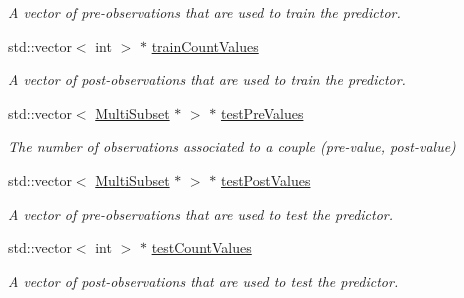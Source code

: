 \begin{DoxyCompactItemize}
\begin{DoxyCompactList}\small\item\em A vector of pre-\/observations that are used to train the predictor. \end{DoxyCompactList}\item 
\hypertarget{classPredictionDataset_af4fdcf7cfd236a99a73f18d630199291}{std\-::vector$<$ int $>$ $\ast$ \hyperlink{classPredictionDataset_af4fdcf7cfd236a99a73f18d630199291}{train\-Count\-Values}}\label{classPredictionDataset_af4fdcf7cfd236a99a73f18d630199291}

\begin{DoxyCompactList}\small\item\em A vector of post-\/observations that are used to train the predictor. \end{DoxyCompactList}\item 
\hypertarget{classPredictionDataset_a6ef1712f6f3e944cad7f966b123c44d4}{std\-::vector$<$ \hyperlink{classMultiSubset}{Multi\-Subset} $\ast$ $>$ $\ast$ \hyperlink{classPredictionDataset_a6ef1712f6f3e944cad7f966b123c44d4}{test\-Pre\-Values}}\label{classPredictionDataset_a6ef1712f6f3e944cad7f966b123c44d4}

\begin{DoxyCompactList}\small\item\em The number of observations associated to a couple (pre-\/value, post-\/value) \end{DoxyCompactList}\item 
\hypertarget{classPredictionDataset_ab6ed50cd17878109b9a41ebb6db172ea}{std\-::vector$<$ \hyperlink{classMultiSubset}{Multi\-Subset} $\ast$ $>$ $\ast$ \hyperlink{classPredictionDataset_ab6ed50cd17878109b9a41ebb6db172ea}{test\-Post\-Values}}\label{classPredictionDataset_ab6ed50cd17878109b9a41ebb6db172ea}

\begin{DoxyCompactList}\small\item\em A vector of pre-\/observations that are used to test the predictor. \end{DoxyCompactList}\item 
\hypertarget{classPredictionDataset_a7fe2eccbdae1cee136f5864b660c31ee}{std\-::vector$<$ int $>$ $\ast$ \hyperlink{classPredictionDataset_a7fe2eccbdae1cee136f5864b660c31ee}{test\-Count\-Values}}\label{classPredictionDataset_a7fe2eccbdae1cee136f5864b660c31ee}

\begin{DoxyCompactList}\small\item\em A vector of post-\/observations that are used to test the predictor. \end{DoxyCompactList}\end{DoxyCompactItemize}


